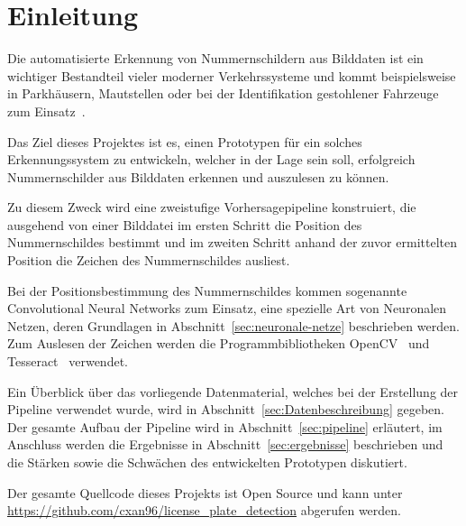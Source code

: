 \section{Einleitung}

Die automatisierte Erkennung von Nummernschildern aus Bilddaten
ist ein wichtiger Bestandteil vieler moderner Verkehrssysteme
und kommt beispielsweise in Parkh\"ausern, Mautstellen
oder bei der Identifikation gestohlener Fahrzeuge zum
Einsatz~\cite{silva2018a}.

Das Ziel dieses Projektes ist es, einen Prototypen f\"ur ein solches
Erkennungssystem zu entwickeln, welcher in der
Lage sein soll, erfolgreich Nummernschilder aus Bilddaten erkennen
und auszulesen zu k\"onnen.

Zu diesem Zweck wird eine zweistufige Vorhersagepipeline konstruiert,
die ausgehend von einer Bilddatei im ersten Schritt die Position des
Nummernschildes bestimmt und im zweiten Schritt anhand der zuvor ermittelten
Position die Zeichen des Nummernschildes ausliest.

Bei der Positionsbestimmung des Nummernschildes kommen sogenannte
Convolutional Neural Networks zum Einsatz, eine spezielle Art von
Neuronalen Netzen, deren Grundlagen in Abschnitt~\ref{sec:neuronale-netze}
beschrieben werden. Zum Auslesen der Zeichen werden die
Programmbibliotheken OpenCV~\cite{opencv_library} und Tesseract~\cite{smith_2007}
verwendet.

Ein \"Uberblick \"uber das vorliegende Datenmaterial, welches
bei der Erstellung der Pipeline verwendet wurde, wird in
Abschnitt~\ref{sec:Datenbeschreibung} gegeben.
Der gesamte Aufbau der Pipeline wird in Abschnitt~\ref{sec:pipeline}
erl\"autert, im Anschluss werden die Ergebnisse in Abschnitt~\ref{sec:ergebnisse}
beschrieben und die St\"arken sowie die Schw\"achen des entwickelten
Prototypen diskutiert.

Der gesamte Quellcode dieses Projekts ist Open Source und kann
unter \url{https://github.com/cxan96/license_plate_detection}
abgerufen werden.
